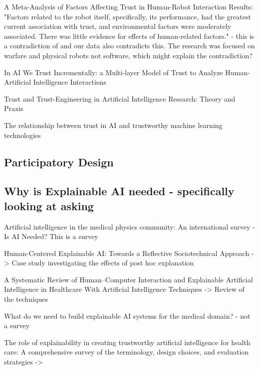 \documentclass[manuscript,screen,review]{acmart}
\begin{document}
A Meta-Analysis of Factors Affecting Trust in Human-Robot Interaction\cite{Hancock2011} Results: "Factors related to the robot itself, specifically, its performance, had the greatest current association with trust, and environmental factors were moderately associated. There was little evidence for effects of human-related factors." - this is a contradiction of \cite{Muir1987} and our data also contradicts this. The research was focused on warfare and physical robots not software, which might explain the contradiction?

In AI We Trust Incrementally: a Multi-layer Model of Trust to Analyze Human-Artificial Intelligence Interactions\cite{Ferrario2020}

Trust and Trust-Engineering in Artificial Intelligence Research: Theory and Praxis\cite{Chen2021}

The relationship between trust in AI and trustworthy machine learning technologies\cite{Toreini2020}

\subsection{Participatory Design}\label{subsec:participatory_design}

\subsection{Why is Explainable AI needed - specifically looking at asking}

Artificial intelligence in the medical physics community: An international survey - Is AI Needed? This is a survey

Human-Centered Explainable AI: Towards a Reflective Sociotechnical Approach -> Case study investigating the effects of post hoc explanation

A Systematic Review of Human–Computer Interaction and Explainable Artificial Intelligence in Healthcare With Artificial Intelligence Techniques -> Review of the techniques

What do we need to build explainable AI systems for the medical domain?  - not a survey

The role of explainability in creating trustworthy artificial intelligence for health care: A comprehensive survey of the terminology, design choices, and evaluation strategies -> 
\end{document}
